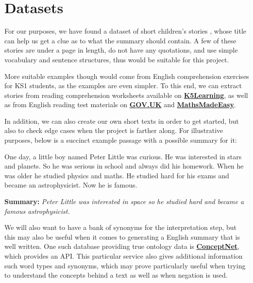 \section{Datasets}

For our purposes, we have found a dataset of short children's stories \cite{noauthor_examples_nodate}\cite{noauthor_short_nodate}, whose title can help us get a clue as to what the summary should contain. A few of these stories are under a page in length, do not have any quotations, and use simple vocabulary and sentence structures, thus would be suitable for this project.

More suitable examples though would come from English comprehension exercises for KS1 students, as the examples are even simpler. To this end, we can extract stories from reading comprehension worksheets available on \textbf{\href{https://www.k5learning.com/reading-comprehension-worksheets/first-grade-1}{K5Learning}}, as well as from English reading test materials on \textbf{\href{https://www.gov.uk/government/publications/key-stage-1-tests-2019-english-reading-test-materials}{GOV.UK}} and \textbf{\href{https://mathsmadeeasy.co.uk/ks1-revision/key-stage-1-sat-english-exam-tests/}{MathsMadeEasy}}.

In addition, we can also create our own short texts in order to get started, but also to check edge cases when the project is farther along. For illustrative purposes, below is a succinct example passage with a possible summary for it:

\begin{displayquote}
One day, a little boy named Peter Little was curious. He was interested in stars and planets. So he was serious in school and always did his homework. When he was older he studied physics and maths. He studied hard for his exams and became an astrophysicist. Now he is famous.
\end{displayquote}

\begin{displayquote}
\textbf{Summary:} \textit{Peter Little was interested in space so he studied hard and became a famous astrophysicist.}
\end{displayquote}

We will also want to have a bank of synonyms for the interpretation step, but this may also be useful when it comes to generating a English summary that is well written. One such database providing true ontology data is \textbf{\href{http://www.conceptnet.io}{ConceptNet}}, which provides an API. This particular service also gives additional information such word types and synonyms, which may prove particularly useful when trying to understand the concepts behind a text as well as when negation is used.

